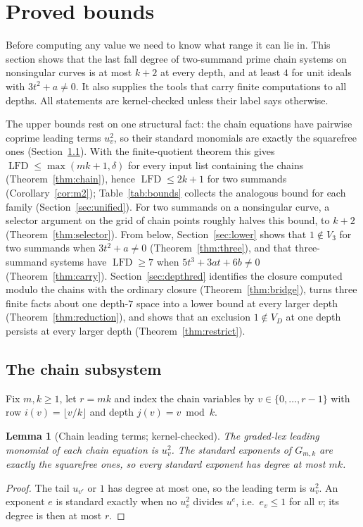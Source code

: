 \documentclass[11pt]{article}
\newtheorem{lemma}[theorem]{Lemma}
\theoremstyle{definition}\newtheorem{definition}[theorem]{Definition}
\theoremstyle{remark}\newtheorem{remark}[theorem]{Remark}
\newcommand{\lfd}{\operatorname{LFD}}
\begin{document}
\section{Proved bounds}\label{sec:bounds}
Before computing any value we need to know what range it can lie in. This
section shows that the last fall degree of two-summand prime chain systems
on nonsingular curves is at most $k+2$ at every depth, and at least $4$ for
unit ideals with $3t^2+a\ne0$. It also supplies the tools that carry finite
computations to all depths. All statements are kernel-checked unless
their label says otherwise.

The upper bounds rest on one structural fact: the chain equations have
pairwise coprime leading terms $u_v^2$, so their standard monomials are
exactly the squarefree ones (Section~\ref{sec:chain}). With the
finite-quotient theorem this gives $\lfd\le\max(mk+1,\delta)$ for every
input list containing the chains (Theorem~\ref{thm:chain}), hence
$\lfd\le2k+1$ for two summands (Corollary~\ref{cor:m2});
Table~\ref{tab:bounds} collects the analogous bound for each family
(Section~\ref{sec:unified}). For two summands on a nonsingular curve, a
selector argument on the grid of chain points roughly halves this bound, to
$k+2$ (Theorem~\ref{thm:selector}). From below, Section~\ref{sec:lower}
shows that $1\notin V_3$ for two summands when $3t^2+a\ne0$
(Theorem~\ref{thm:three}), and that three-summand systems have $\lfd\ge7$
when $5t^3+3at+6b\ne0$ (Theorem~\ref{thm:carry}).
Section~\ref{sec:depthred} identifies the closure computed modulo the chains
with the ordinary closure (Theorem~\ref{thm:bridge}), turns three finite
facts about one depth-$7$ space into a lower bound at every larger depth
(Theorem~\ref{thm:reduction}), and shows that an exclusion $1\notin V_D$ at
one depth persists at every larger depth (Theorem~\ref{thm:restrict}).

\subsection{The chain subsystem}\label{sec:chain}
Fix $m,k\ge1$, let $r=mk$ and index the chain variables by
$v\in\{0,\ldots,r-1\}$ with row $i(v)=\lfloor v/k\rfloor$ and depth
$j(v)=v\bmod k$.

\begin{lemma}[Chain leading terms; kernel-checked]\label{lem:leading}
The graded-lex leading monomial of each chain equation is $u_v^2$. The
standard exponents of $G_{m,k}$ are exactly the squarefree ones, so every
standard exponent has degree at most $mk$.
\end{lemma}
\begin{proof}
The tail $u_{v'}$ or $1$ has degree at most one, so the leading term is
$u_v^2$. An exponent $e$ is standard exactly when no $u_v^2$ divides $u^e$,
i.e.\ $e_v\le1$ for all $v$; its degree is then at most $r$.
\end{proof}
\end{document}
